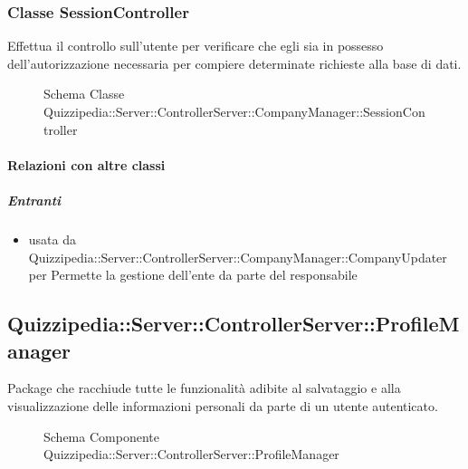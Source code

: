 \subsubsection{Classe SessionController}
Effettua il controllo sull'utente per verificare che egli sia in possesso dell'autorizzazione necessaria per compiere determinate richieste alla base di dati.
\begin{figure}[H]
\centering
\noindent{}
\caption[Schema Classe SessionController]{Schema Classe Quizzipedia::Server::ControllerServer::CompanyManager::SessionController}
\end{figure}
\paragraph{Relazioni con altre classi}
\subparagraph{Entranti}
\begin{itemize}
\item usata da Quizzipedia::Server::ControllerServer::CompanyManager::CompanyUpdater per Permette la gestione dell'ente da parte del responsabile
\end{itemize}
\subsection{Quizzipedia::Server::ControllerServer::ProfileManager}
Package che racchiude tutte le funzionalità adibite al salvataggio e alla visualizzazione delle informazioni personali da parte di un utente autenticato.
\begin{figure}[H]
\centering
\noindent{}
\caption[Schema Componente Quizzipedia::Server::ControllerServer::ProfileManager]{Schema Componente Quizzipedia::Server::ControllerServer::ProfileManager}
\end{figure}
